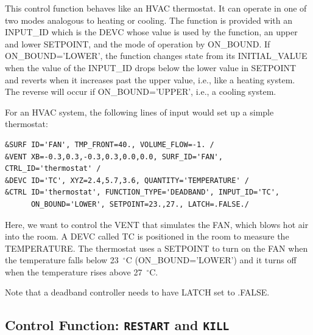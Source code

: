 \documentclass[11pt]{book}
\begin{document}
This control function behaves like an HVAC thermostat.  It can operate in one of two modes analogous to heating or cooling. The function is provided with an {\ct INPUT\_ID} which is the {\ct DEVC} whose value is used by the function, an upper and lower {\ct SETPOINT}, and the mode of operation by {\ct ON\_BOUND}.  If  {\ct ON\_BOUND='LOWER'}, the function changes state from its {\ct INITIAL\_VALUE} when the value of the {\ct INPUT\_ID} drops below the lower value in {\ct SETPOINT} and reverts when it increases past the upper value, i.e., like a heating system. The reverse will occur if {\ct ON\_BOUND='UPPER'}, i.e., a cooling system.

For an HVAC system, the following lines of input would set up a simple thermostat:
\begin{lstlisting}
&SURF ID='FAN', TMP_FRONT=40., VOLUME_FLOW=-1. /
&VENT XB=-0.3,0.3,-0.3,0.3,0.0,0.0, SURF_ID='FAN', CTRL_ID='thermostat' /
&DEVC ID='TC', XYZ=2.4,5.7,3.6, QUANTITY='TEMPERATURE' /
&CTRL ID='thermostat', FUNCTION_TYPE='DEADBAND', INPUT_ID='TC',
      ON_BOUND='LOWER', SETPOINT=23.,27., LATCH=.FALSE./
\end{lstlisting}
Here, we want to control the {\ct VENT} that simulates the {\ct FAN}, which blows hot air into the room. A {\ct DEVC} called {\ct TC} is positioned in the room to measure the {\ct TEMPERATURE}. The {\ct thermostat} uses a {\ct SETPOINT} to turn on the {\ct FAN} when the temperature falls below 23~$^\circ$C ({\ct ON\_BOUND='LOWER'}) and it turns off when the temperature rises above 27~$^\circ$C.

Note that a deadband controller needs to have {\ct LATCH} set to {\ct .FALSE.}


\subsection{Control Function: \texorpdfstring{{\tt RESTART} and {\tt KILL}} {RESTARTKILL} }
\end{document}
